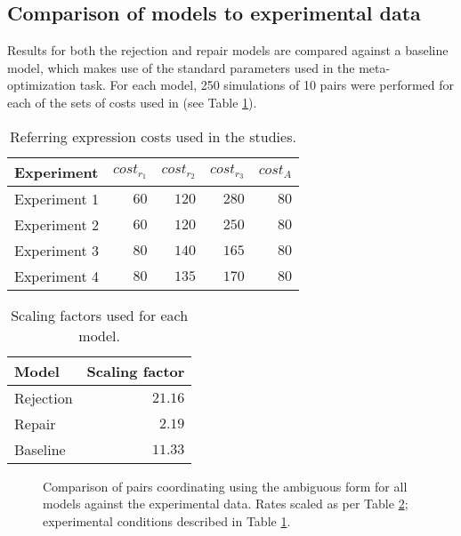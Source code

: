 \documentclass[12pt,a4paper]{article}
\begin{document}
\subsection{Comparison of models to experimental data}
\label{sec:model_comparison}
Results for both the rejection and repair models are compared against a baseline model, which makes use of the standard parameters used in the meta-optimization task. For each model, 250 simulations of 10 pairs were performed for each of the sets of costs used in \citeauthor{rohde2012} (see Table \ref{table:2}).
\begin{table}
\begin{center}
    \begin{tabular}{ l r r r r }
    Experiment & $cost_{r_1}$ & $cost_{r_2}$ & $cost_{r_3}$ & $cost_A$\\ \hline
    Experiment 1 & $60$ & $120$ & $280$ & $80$ \\ \hline
    Experiment 2 & $60$ & $120$ & $250$ & $80$ \\ \hline
    Experiment 3 & $80$ & $140$ & $165$ & $80$ \\ \hline
    Experiment 4 & $80$ & $135$ & $170$ & $80$ \\ 
    \end{tabular}
    \caption{Referring expression costs used in the \citeauthor{rohde2012} studies.}
    \label{table:2}
\end{center}
\end{table}

\begin{table}
\begin{center}
    \begin{tabular}{ l r }
    Model & Scaling factor \\ \hline
    Rejection & $21.16$ \\ \hline
    Repair & $2.19$ \\ \hline
    Baseline & $11.33$ \\ \hline
    \end{tabular}
    \caption{Scaling factors used for each model.}
    \label{table:3}
\end{center}
\end{table}

\begin{figure}
\centering
\scalebox{.65}{}
\caption{Comparison of pairs coordinating using the ambiguous form for all models against the experimental data. Rates scaled as per Table \ref{table:3}; experimental conditions described in Table \ref{table:2}.}
\label{fig:model_comp}
\end{figure}
\end{document}
